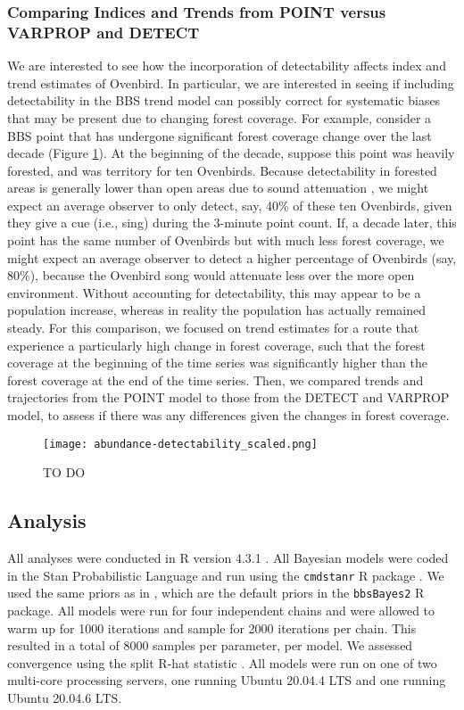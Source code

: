 \documentclass[12pt]{article}
\begin{document}
\subsubsection{Comparing Indices and Trends from POINT versus VARPROP and DETECT}

\par We are interested to see how the incorporation of detectability affects index and trend estimates of Ovenbird.
In particular, we are interested in seeing if including detectability in the BBS trend model can possibly correct for systematic biases that may be present due to changing forest coverage.
For example, consider a BBS point that has undergone significant forest coverage change over the last decade (Figure \ref{fig:example}).
At the beginning of the decade, suppose this point was heavily forested, and was territory for ten Ovenbirds. 
Because detectability in forested areas is generally lower than open areas due to sound attenuation \citep{yip_sound_2017}, we might expect an average observer to only detect, say, 40\% of these ten Ovenbirds, given they give a cue (i.e., sing) during the 3-minute point count.
If, a decade later, this point has the same number of Ovenbirds but with much less forest coverage, we might expect an average observer to detect a higher percentage of Ovenbirds (say, 80\%), because the Ovenbird song would attenuate less over the more open environment.
Without accounting for detectability, this may appear to be a population increase, whereas in reality the population has actually remained steady.
For this comparison, we focused on trend estimates for a route that experience a particularly high change in forest coverage, such that the forest coverage at the beginning of the time series was significantly higher than the forest coverage at the end of the time series.
Then, we compared trends and trajectories from the POINT model to those from the DETECT and VARPROP model, to assess if there was any differences given the changes in forest coverage.

\begin{figure}[h]
	\texttt{[image: abundance-detectability\_scaled.png]}
	\caption{TO DO}
	\label{fig:example}
\end{figure}

\subsection{Analysis}
\par All analyses were conducted in R version 4.3.1 \citep{r_core_team_r_2024}.
All Bayesian models were coded in the Stan Probabilistic Language \citep{stan_development_team_stan_2024} and run using the \texttt{cmdstanr} R package \citep{gabry_cmdstanr_2023}.
We used the same priors as in \citet{smith_spatially_2023}, which are the default priors in the \texttt{bbsBayes2} R package.
All models were run for four independent chains and were allowed to warm up for 1000 iterations and sample for 2000 iterations per chain.
This resulted in a total of 8000 samples per parameter, per model.
We assessed convergence using the split R-hat statistic \citep{vehtari_rank-normalization_2021}.
All models were run on one of two multi-core processing servers, one running Ubuntu 20.04.4 LTS and one running Ubuntu 20.04.6 LTS.
\end{document}
